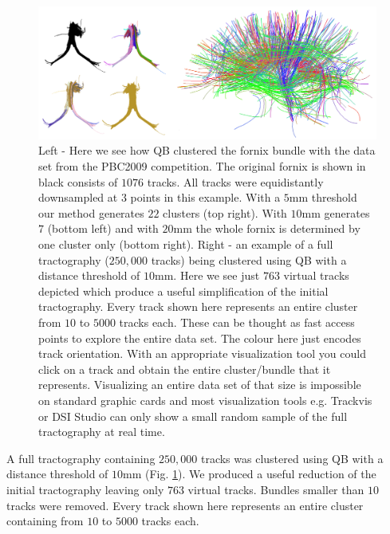 \documentclass[preprint,authoryear,a4paper,10pt,onecolumn]{elsarticle}
\begin{document}
%
\begin{figure}
\begin{centering}
\includegraphics[scale=0.6]{last_figures/LSC_simple}
\par\end{centering}
\caption{Left - Here we see how QB clustered the fornix bundle with the
  data set from the PBC2009 competition. The original fornix is shown in
  black consists of $1076$ tracks. All tracks were equidistantly
  downsampled at $3$ points in this example. With a $5$mm threshold our
  method generates $22$ clusters (top right). With $10$mm generates $7$
  (bottom left) and with $20$mm the whole fornix is determined by one
  cluster only (bottom right). Right - an example of a full tractography
  ($250,000$ tracks) being clustered using QB with a distance threshold
  of $10$mm. Here we see just $763$ virtual tracks depicted which
  produce a useful simplification of the initial tractography. Every
  track shown here represents an entire cluster from $10$ to $5000$
  tracks each. These can be thought as fast access points to explore the
  entire data set. The colour here just encodes track orientation.  With
  an appropriate visualization tool you could click on a track and
  obtain the entire cluster/bundle that it represents. Visualizing an
  entire data set of that size is impossible on standard graphic cards
  and most visualization tools e.g. Trackvis or DSI Studio can only show
  a small random sample of the full tractography at real time.\label{Flo:QB_fornix}}
\centering{}
\end{figure}

A full tractography containing $250,000$ tracks was clustered using QB
with a distance threshold of $10$mm (Fig. \ref{Flo:QB_fornix}).  We
produced a useful reduction of the initial tractography leaving only
$763$ virtual tracks. Bundles smaller than $10$ tracks were
removed. Every track shown here represents an entire cluster containing
from $10$ to $5000$ tracks each.
\end{document}
